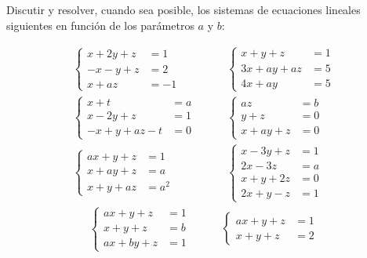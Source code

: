 \begin{ejercicio}Discutir y resolver, cuando sea posible, los sistemas de ecuaciones lineales siguientes en función de
	los parámetros $a$ y $b$:

	\begin{align*}
		\left\{ \begin{array}{rcl}
			        x + 2y + z & = 1  \\
			        -x - y + z & = 2  \\
			        x + az     & = -1
		        \end{array} \right. & \qquad
		\left\{ \begin{array}{rcl}
			        x + y + z    & = 1 \\
			        3x + ay + az & = 5 \\
			        4x + ay      & = 5
		        \end{array} \right.          \\
		\left\{ \begin{array}{rcl}
			        x + t           & = a \\
			        x - 2y + z      & = 1 \\
			        -x + y + az - t & = 0
		        \end{array} \right. & \qquad
		\left\{ \begin{array}{rcl}
			        az         & = b \\
			        y + z      & = 0 \\
			        x + ay + z & = 0
		        \end{array} \right.          \\
		\left\{ \begin{array}{rcl}
			        ax + y + z & = 1   \\
			        x + ay + z & = a   \\
			        x + y + az & = a^2
		        \end{array} \right. & \qquad
		\left\{ \begin{array}{rcl}
			        x - 3y + z & = 1 \\
			        2x - 3z    & = a \\
			        x + y + 2z & = 0 \\
			        2x + y - z & = 1
		        \end{array} \right.
	\end{align*}
	\begin{align*}
		\left\{ \begin{array}{rcl}
			        ax + y + z  & = 1 \\
			        x + y + z   & = b \\
			        ax + by + z & = 1
		        \end{array} \right. & \qquad
		\left\{ \begin{array}{rcl}
			        ax + y + z & = 1 \\
			        x + y + z  & = 2
		        \end{array} \right.
	\end{align*}


\end{ejercicio}
